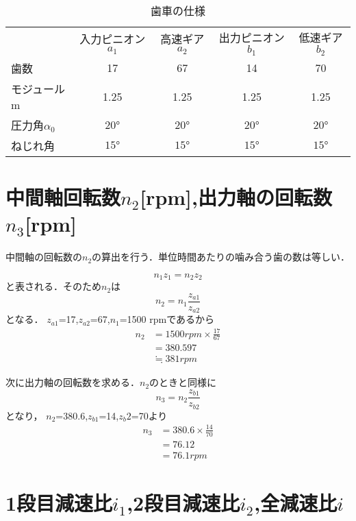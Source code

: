\documentclass[a4paper,titlepage]{ltjsarticle}
\begin{document}
\clearpage
\begin{table}[hbtp]
	\centering
	\caption{歯車の仕様}
	\label{}
	\begin{tabular}{l|cccc}
		\toprule
		&入力ピニオン$a_1$&高速ギア$a_2$&出力ピニオン$b_1$&低速ギア$b_2$\\
		歯数&17&67&14&70\\
		モジュールm&1.25&1.25&1.25&1.25\\
		圧力角$\alpha _0$&20°&20°&20°&20°\\
		ねじれ角\beta &$\ang{15}$&$\ang{15}$&$\ang{15}$&$\ang{15}$\\
	 \bottomrule
	\end{tabular}
\end{table}

\section{中間軸回転数$n_2$[rpm],出力軸の回転数$n_3$[rpm]}

中間軸の回転数の$n_2$の算出を行う．単位時間あたりの噛み合う歯の数は等しい．

\begin{equation}
	n_1z_1=n_2z_2
\end{equation}
と表される．そのため$n_2$は
\begin{equation}
	n_2=n_1\frac{z_{a1}}{z_{a2}}
\end{equation}
となる．
$z_{a1}$=17,$z_{a2}$=67,$n_1$=1500 \si{rpm}であるから
\begin{align}
	n_2&=1500{ \si{rpm}} \times\frac{17}{67}\\
	   &=380.597\\
		 &\fallingdotseq381{ \si{rpm}}
\end{align}

次に出力軸の回転数を求める．$n_2$のときと同様に
\begin{equation}
	n_3=n_2\frac{z_{b1}}{z_{b2}}
\end{equation}
となり，
$n_2$=380.6,$z_{b1}$=14,$z_b2$=70より
\begin{align}
	n_3&=380.6\times\frac{14}{70}\\
	   &=76.12 \\
		 &=76.1{ \si{rpm}}
\end{align}

\section{1段目減速比$i_1$,2段目減速比$i_2$,全減速比$i$}
\end{document}
